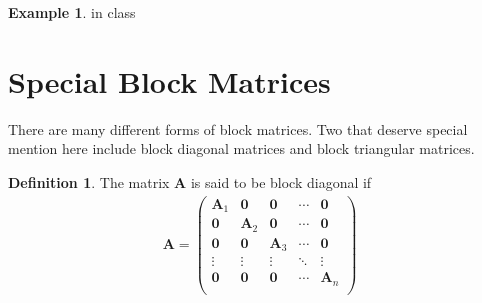 \documentclass[
]{book}
\theoremstyle{definition}
\newtheorem{definition}{Definition}[chapter]
\theoremstyle{definition}
\newtheorem{example}{Example}[chapter]
\theoremstyle{definition}
\theoremstyle{definition}
\theoremstyle{remark}
\begin{document}
\begin{example}
in class
\end{example}

\hypertarget{special-block-matrices}{%
\section{Special Block Matrices}\label{special-block-matrices}}

There are many different forms of block matrices. Two that deserve special mention here include block diagonal matrices and block triangular matrices.

\begin{definition}
The matrix \(\mathbf{A}\) is said to be block diagonal if
\[
\begin{aligned}
\mathbf{A} = \begin{pmatrix} 
\mathbf{A}_1 & \mathbf{0} & \mathbf{0} & \cdots & \mathbf{0} \\
\mathbf{0} & \mathbf{A}_2 & \mathbf{0} & \cdots & \mathbf{0} \\
\mathbf{0} & \mathbf{0} & \mathbf{A}_3 & \cdots & \mathbf{0} \\
\vdots & \vdots & \vdots & \ddots & \vdots \\
\mathbf{0} & \mathbf{0} & \mathbf{0} & \cdots & \mathbf{A}_n \\
\end{pmatrix}
\end{aligned}
\]
\end{definition}
\end{document}
